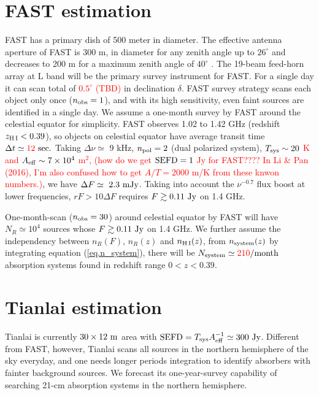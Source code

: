 \documentclass[]{raa}
\newcommand{\HI}{{H{\small\,I}}}
\newcommand{\tcr}{\textcolor{red}}
\begin{document}
\section{FAST estimation}\label{sec.FAST}

FAST has a primary dish of 500 meter in diameter. The effective
antenna aperture of FAST is 300 m, in diameter for any zenith angle
up to $26^\circ$ and decreases to 200 m for a maximum zenith angle 
of $40^\circ$ \citep{2016RaSc...51.1060L}.
The 19-beam feed-horn array at L band will be the primary survey
instrument for FAST. For a single day it can scan total of \tcr{$0.5^\circ$ (TBD)}
in declination $\delta$. FAST survey strategy scans each object
only once ($n_{\rm obs}=1$), and with its high sensitivity,
even faint sources are identified in a single day. 
We assume a one-month survey by FAST
around the celestial equator for simplicity. FAST observes
1.02 to 1.42 GHz (redshift $z_{\rm \HI}<0.39$), so objects on celestial equator
have average transit time $\Delta t \simeq \tcr{12}\ {\rm sec.}$
Taking $\Delta\nu\simeq$ 9 kHz, $n_{\rm pol}=2$ (dual polarized system),
\tcr{$T_{\rm sys}\sim 20$ K and $A_{\rm eff}\sim 7\times 10^4$ m$^2$,
(how do we get ${\rm SEFD}=1$ Jy for FAST???? In Li \& Pan (2016), I'm also
confused how to get $A/T=2000$ m/K from these knwon numbers.)},
we have $\Delta F \simeq\ 2.3\ {\rm mJy}$.
Taking into account the $\nu^{-0.7}$ flux boost at lower
frequencies, $rF>10\Delta F$ requires $F\gtrsim 0.11\ {\rm Jy}$ on 1.4 GHz.

One-month-scan ($n_{\rm obs}=30$) around celestial equator by FAST will have
$N_R\simeq 10^4$ sources whose $F\gtrsim 0.11\ {\rm Jy}$ on 1.4 GHz.
We further assume the independency between $n_R(F)$, $n_R(z)$
and $n_{\rm\HI}(z)$, from $n_{\rm system}(z)$ by integrating
equation (\ref{eq.n_system}), there will be $N_{\rm system}\simeq \tcr{210} {\rm /month}$ absorption
systems found in redshift range $0<z<0.39$.


\section{Tianlai estimation}\label{sec.Tianlai}

Tianlai is currently $30\times 12\ {\rm m}$ area with
\tcr{${\rm SEFD}=T_{\rm sys}A_{\rm eff}^{-1}\simeq 300\ {\rm Jy}$}. Different from FAST, however,
Tianlai scans all sources in the northern hemisphere of the sky
everyday, and one needs longer periods integration to
identify absorbers with fainter background sources.
We forecast its one-year-survey capability of searching 21-cm
absorption systems in the northern hemisphere.
\end{document}
